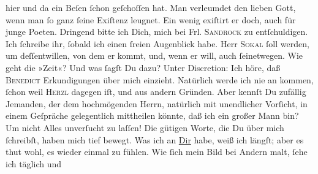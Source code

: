 \begin{ledgroupsized}[t]{13cm}
               hier und da ein Beſen ſchon geſchoſſen hat. Man 
               verleumdet den lieben Gott, wenn man ſo ganz ſeine Exiſtenz leugnet. Ein wenig
               exiſtirt er doch, auch für junge Poeten.\pend
           \pstart
           Dringend bitte ich Dich, mich bei Frl. \textsc{Sandrock} zu entſchuldigen. Ich ſchreibe ihr, ſobald ich einen ſreien Augenblick
               habe.\pend
           \pstart
           Herr \textsc{Sokal} ſoll \label{K_L02622-8v}\label{K_L02622-8h} werden, {\pb}um deſſentwillen, von dem er kommt, und, wenn er
               will, auch ſeinetwegen.\pend
           \pstart
           Wie geht die »Zeit«? Und was ſagſt Du dazu?\pend
           \pstart
           Unter Discretion: Ich höre, daß \textsc{Benedict} Erkundigungen über mich einzieht. Natürlich werde ich nie an \label{K_L02622-9v}\label{K_L02622-9h} kommen, ſchon weil \textsc{Herzl} dagegen iſt, und aus andern Gründen. Aber kennſt Du zufällig Jemanden, der dem
               hochmögenden Herrn, natürlich mit unendlicher
               Vorſicht, in einem Geſpräche gelegentlich mittheilen könnte, {\pb}daß ich ein großer Mann bin? Um nicht Alles
               unverſucht zu laſſen!\pend
           \pstart
           Die gütigen Worte, die Du über mich ſchreibſt, haben mich tief bewegt. Was ich an \uline{Dir} habe, weiß ich längſt; aber es thut wohl, es
               wieder einmal zu fühlen. Wie ſich mein Bild bei Andern malt, ſehe ich täglich und

\end{ledgroupsized}
